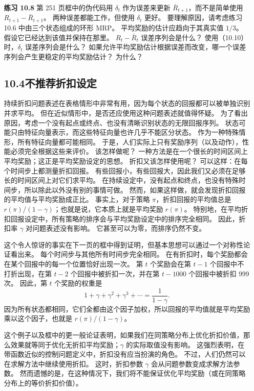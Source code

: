 \documentclass[UTF8,12pt,a4paper,fontset=fandol]{ctexart}
\begin{document}
\noindent\textbf{练习 10.8}
第 251 页框中的伪代码用 $\delta_t$ 作为误差来更新 $\bar R_{t+1}$，而不是简单使用 $R_{t+1}-\bar R_{t+1}$。
两种误差都能工作，但使用 $\delta_t$ 更好。
要理解原因，请考虑练习 10.6 中由三个状态组成的环形 MRP。
平均奖励的估计应趋向于其真实值 $1/3$。
假设它已经达到该值并保持在那里。
$R_t-\bar R_t$ 误差序列会是什么？
使用（10.10）时，$\delta_t$ 误差序列会是什么？
如果允许平均奖励估计根据误差而改变，哪一个误差序列会产生更稳定的平均奖励估计？
为什么？

\subsection*{10.4\quad 不推荐折扣设定}

持续折扣问题表述在表格情形中非常有用，因为每个状态的回报都可以被单独识别并求平均。
但在近似情形中，是否还应使用这种问题表述就值得怀疑。
为了看出原因，考虑一个没有起点或终点、也没有清晰识别状态的无限回报序列。
状态可能只由特征向量表示，而这些特征向量也许几乎不能区分状态。
作为一种特殊情形，所有特征向量都可能相同。
于是，人们实际上只有奖励序列（以及动作），性能必须完全根据这些来评价。
该怎样做呢？
一种方法是在一个很长的时间区间上平均奖励；这正是平均奖励设定的思想。
折扣又该怎样使用呢？
可以这样：在每个时间步上都测量折扣回报。
有些回报小，有些回报大，因此我们又必须在足够长的时间区间上对它们求平均。
在持续设定中，没有起点和终点，也没有特殊时间步，所以除此以外没有别的事情可做。
然而，如果这样做，就会发现折扣回报的平均值与平均奖励成正比。
事实上，对于策略 $\pi$，折扣回报的平均值总是 $r(\pi)/(1-\gamma)$；也就是说，它本质上就是平均奖励 $r(\pi)$。
特别地，在平均折扣回报设定中，所有策略的排序会与平均奖励设定中的排序完全相同。
因此，折扣率 $\gamma$ 对问题表述没有影响。
它甚至可以为零，而排序仍然不变。

这个令人惊讶的事实在下一页的框中得到证明，但基本思想可以通过一个对称性论证看出来。
每个时间步与其他所有时间步完全相同。
在有折扣时，每个奖励都会在某个回报中的每一个位置恰好出现一次。
第 $t$ 个奖励会在第 $t-1$ 个回报中不打折出现，在第 $t-2$ 个回报中被折扣一次，并在第 $t-1000$ 个回报中被折扣 999 次。
因此，第 $t$ 个奖励的权重是
\[
1+\gamma+\gamma^2+\gamma^3+\cdots=\frac{1}{1-\gamma}.
\]
因为所有状态都相同，它们全都由这个因子加权，所以回报的平均值就是平均奖励乘以这个因子，也就是 $r(\pi)/(1-\gamma)$。

这个例子以及框中的更一般论证表明，如果我们在同策略分布上优化折扣价值，那么效果就等同于优化无折扣平均奖励；$\gamma$ 的实际取值没有影响。
这强烈表明，在带函数近似的控制问题定义中，折扣没有应当扮演的角色。
不过，人们仍然可以在求解方法中继续使用折扣。
这时，折扣参数 $\gamma$ 会从问题参数变成求解方法参数。
然而遗憾的是，在这种情况下，我们将不能保证优化平均奖励（或在同策略分布上的等价折扣价值）。
\end{document}
